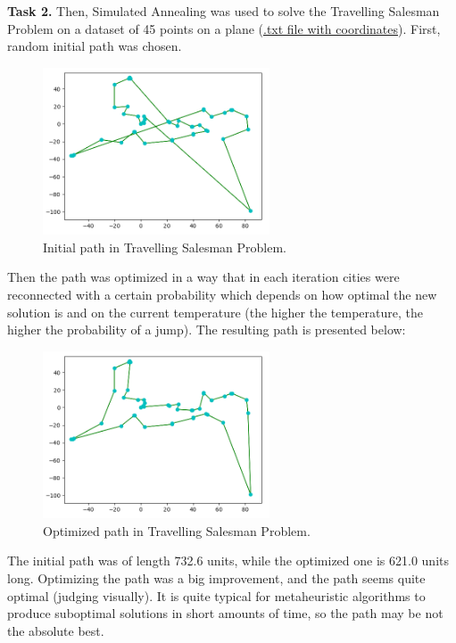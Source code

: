 \documentclass[12pt, a4paper]{article}
\begin{document}
\newpage

\textbf{Task 2.} Then, Simulated Annealing was used to solve the Travelling Salesman Problem on a dataset of 45 points on a plane (\href{https://github.com/Dormant512/itmo_lab_listings/blob/main/coords.txt}{.txt file with coordinates}). First, random initial path was chosen.

\vspace{-3mm}
\begin{figure}[!h]
\centering
\includegraphics[width=0.6\textwidth]{pic2.png}
\caption{Initial path in Travelling Salesman Problem.}
\end{figure}

Then the path was optimized in a way that in each iteration cities were reconnected with a certain probability which depends on how optimal the new solution is and on the current temperature (the higher the temperature, the higher the probability of a jump). The resulting path is presented below:

\begin{figure}[!h]
\centering
\includegraphics[width=0.6\textwidth]{pic3.png}
\caption{Optimized path in Travelling Salesman Problem.}
\end{figure}

The initial path was of length 732.6 units, while the optimized one is 621.0 units long. Optimizing the path was a big improvement, and the path seems quite optimal (judging visually). It is quite typical for metaheuristic algorithms to produce suboptimal solutions in short amounts of time, so the path may be not the absolute best.
\end{document}
